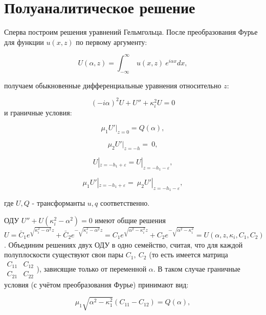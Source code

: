 \documentclass[a4paper, 12pt]{article}
\begin{document}
\section{Полуаналитическое решение}
Сперва построим решения уравнений Гельмгольца. После преобразования Фурье для функции $u(x,z)$ по первому аргументу:

\begin{equation}
    U(\alpha,z)=\int_{-\infty}^{\infty}\ u(x,z) \ e^{i\alpha x} dx,
\end{equation}

получаем обыкновенные дифференциальные уравнения относительно $z$:

$$(-i\alpha)^2 U+U''+\kappa_i^2U=0$$
и граничные условия:

\begin{equation}
   \mu_1 U'|_{z=0}=Q(\alpha), 
\end{equation}

\begin{equation}
    \mu_2  U'|_{z=-h}=\ 0,
\end{equation}

\begin{equation}
    U|_{z=-h_1+\varepsilon}=U|_{z=-h_1-\varepsilon},
\end{equation}

\begin{equation}
    \mu_1  U'|_{z=-h_1+\varepsilon}=\ \mu_2  U'|_{z=-h_1-\varepsilon},
\end{equation}

где $U, Q$ - трансформанты $u, q$ соответственно.

ОДУ $U'' +U (\kappa_i^2-\alpha^2)=0$ имеют общие решения $U=\bar C_1 e^{\sqrt{\kappa_i^2-\alpha^2} z} + \bar C_2 e^{-\sqrt{\kappa_i^2-\alpha^2} z}=C_1 e^{\sqrt{\alpha^2-\kappa_i^2} z} + C_2e^{-\sqrt{\alpha^2-\kappa_i^2}}=U(\alpha,z,\kappa_i,C_1,C_2)$. Объединим решениях двух ОДУ в одно семейство, считая, что для каждой полуплоскости существуют свои пары $C_1,\ C_2$ (то есть имеется матрица $\begin{matrix} C_{11} & C_{12} \\ C_{21} & C_{22} \end{matrix}$), зависящие только от переменной $\alpha$. В таком случае граничные условия (с учётом преобразования Фурье) принимают вид:

    \begin{equation}
    \mu_1 \sqrt{\alpha^2-\kappa_1^2} (C_{11}-C_{12})=Q(\alpha),
    \end{equation}   
\end{document}
